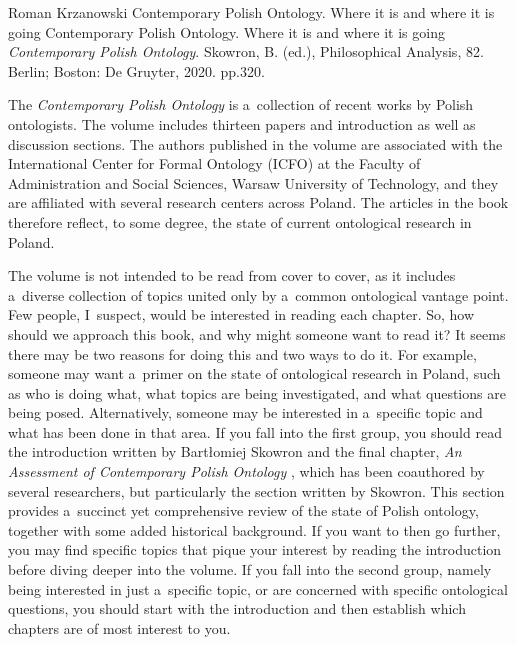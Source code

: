 \begin{recengenv}{Roman Krzanowski}
	{Contemporary Polish Ontology. Where it is and where it is going}
	{Contemporary Polish Ontology. Where it is and where it is going}
	{\textit{Contemporary Polish Ontology}. Skowron, B. (ed.), Philosophical Analysis, 82. Berlin; Boston: De Gruyter, 2020. pp.320.}

The \textit{Contemporary Polish Ontology} is a~collection of recent works by Polish ontologists. The volume includes thirteen papers and introduction as well as discussion sections. The authors published in the volume are associated with the International Center for Formal Ontology (ICFO) at the Faculty of Administration and Social Sciences, Warsaw University of Technology, and they are affiliated with several research centers across Poland. The articles in the book therefore reflect, to some degree, the state of current ontological research in Poland.

The volume is not intended to be read from cover to cover, as it includes a~diverse collection of topics united only by a~common ontological vantage point. Few people, I~suspect, would be interested in reading each chapter. So, how should we approach this book, and why might someone want to read it? It seems there may be two reasons for doing this and two ways to do it. For example, someone may want a~primer on the state of ontological research in Poland, such as who is doing what, what topics are being investigated, and what questions are being posed. Alternatively, someone may be interested in a~specific topic and what has been done in that area. If you fall into the first group, you should read the introduction written by Bartłomiej Skowron and the final chapter, \textit{An Assessment of Contemporary Polish Ontology}
\parencite[][pp.271–294]{skowron_contemporary_2020}, %
 which has been coauthored by several researchers, but particularly the section written by Skowron. This section provides a~succinct yet comprehensive review of the state of Polish ontology, together with some added historical background. If you want to then go further, you may find specific topics that pique your interest by reading the introduction before diving deeper into the volume. If you fall into the second group, namely being interested in just a~specific topic, or are concerned with specific ontological questions, you should start with the introduction and then establish which chapters are of most interest to you.


\end{recengenv}
